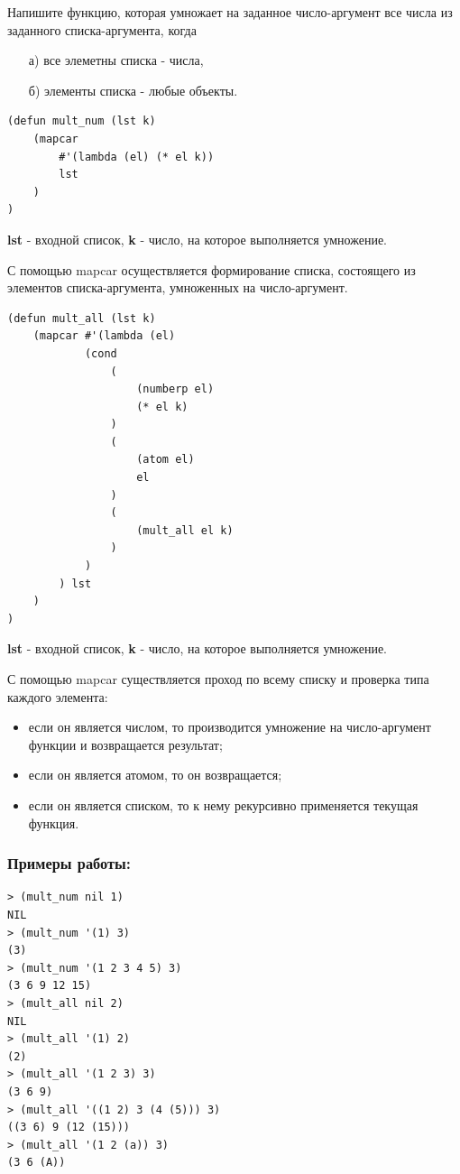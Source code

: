 Напишите функцию, которая умножает на заданное число-аргумент все числа из заданного списка-аргумента, когда
\begin{enumerate}
	\item[а)] все элеметны списка - числа,
	\item[б)] элементы списка - любые объекты.\\
\end{enumerate}

\begin{lstlisting}[caption=Функция умножения для списка из чисел]
(defun mult_num (lst k)
	(mapcar 
		#'(lambda (el) (* el k))
		lst
	)
)
\end{lstlisting}
\textbf{lst} - входной список, \textbf{k} - число, на которое выполняется умножение.

С помощью mapcar осуществляется формирование списка, состоящего из элементов списка-аргумента, умноженных на число-аргумент.

\begin{lstlisting}[caption=Функция умножения для списка из любых объектов]
(defun mult_all (lst k)
	(mapcar #'(lambda (el)
			(cond
				(
					(numberp el)
					(* el k)
				)
				(
					(atom el)
					el
				)
				(
					(mult_all el k)
				)
			)
		) lst
	)
)
\end{lstlisting}
\textbf{lst} - входной список, \textbf{k} - число, на которое выполняется умножение.

С помощью mapcar существляется проход по всему списку и проверка типа каждого элемента: 
\begin{itemize}
	\item если он является числом, то производится умножение на число-аргумент функции и возвращается результат;
	\item если он является атомом, то он возвращается;
	\item если он является списком, то к нему рекурсивно применяется текущая функция.
\end{itemize}

\subsubsection*{Примеры работы:}
\begin{lstlisting}
> (mult_num nil 1)
NIL
> (mult_num '(1) 3)
(3)
> (mult_num '(1 2 3 4 5) 3)
(3 6 9 12 15)
> (mult_all nil 2)
NIL
> (mult_all '(1) 2)
(2)
> (mult_all '(1 2 3) 3)
(3 6 9)
> (mult_all '((1 2) 3 (4 (5))) 3)
((3 6) 9 (12 (15)))
> (mult_all '(1 2 (a)) 3)
(3 6 (A))
\end{lstlisting}

